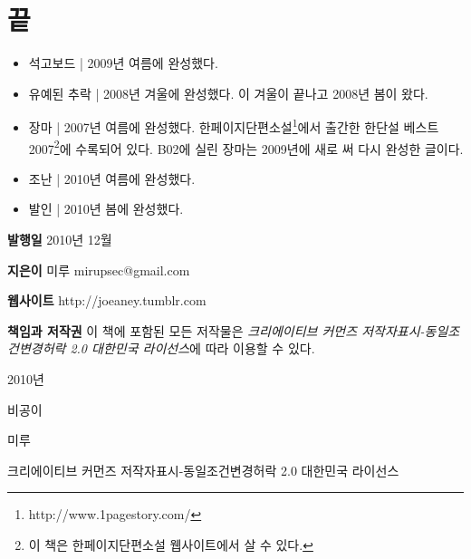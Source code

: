 \documentclass[a5paper,10pt, twoside, openright]{memoir}
\begin{document}
	\newpage{}
		\pagestyle{empty}	
	\tableofcontents*{}
	
	\chapter*{끝}
	\begin{itemize}
	\item{석고보드} | 2009년 여름에 완성했다.
	 
	 \item{유예된 추락} | 2008년 겨울에 완성했다. 이 겨울이 끝나고 2008년 봄이 왔다.
	
	\item{장마} | 2007년 여름에 완성했다. 한페이지단편소설\footnote{http://www.1pagestory.com/}에서 출간한 한단설 베스트 2007\footnote{이 책은 한페이지단편소설 웹사이트에서 살 수 있다.}에 수록되어 있다. B02에 실린 장마는 2009년에 새로 써 다시 완성한 글이다.

	\item{조난} | 2010년 여름에 완성했다.
	
	\item{발인} | 2010년 봄에 완성했다.
	\end{itemize}

	\newpage{}
	\calccentering{\unitlength}
	\begin{adjustwidth*}{7em}{1em}
	\begin{description}
	\item{\textbf{발행일}}
		2010년 12월
	\item{\textbf{지은이}} 
		미루 mirupsec@gmail.com
	\item{\textbf{웹사이트}}
		http://joeaney.tumblr.com
	\item{\textbf{책임과 저작권}}
		이 책에 포함된 모든 저작물은 \emph{크리에이티브 커먼즈 저작자표시-동일조건변경허락 2.0 대한민국 라이선스}에 따라 이용할 수 있다. 
	\end{description}
	\end{adjustwidth*}
	
	\newpage{}
	2010년
	
	비공이
	
	미루
	
	\begin{center}
	\scriptsize{크리에이티브 커먼즈 저작자표시-동일조건변경허락 2.0 대한민국 라이선스}\pagebreak
	\end{center}
\end{document}
